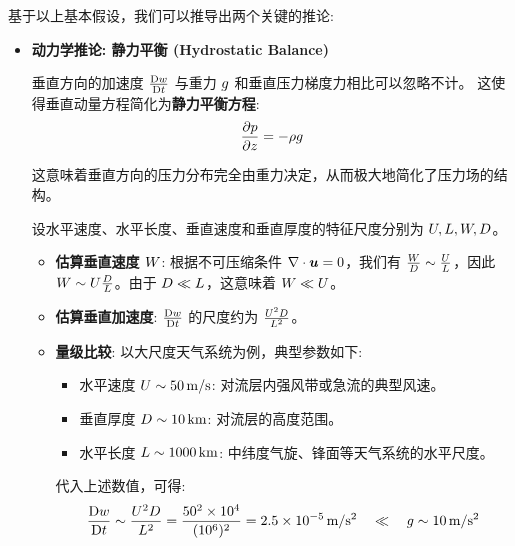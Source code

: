 基于以上基本假设，我们可以推导出两个关键的推论:
\begin{itemize}
    \item \textbf{动力学推论: 静力平衡 (Hydrostatic Balance)}

    垂直方向的加速度 $\frac{\mathrm{D} w}{\mathrm{D} t}$ 与重力 $g$ 和垂直压力梯度力相比可以忽略不计。
    这使得垂直动量方程简化为\textbf{静力平衡方程}:
    \begin{equation}
        \pde{\pressure}{z} = -\density \gravityconst
        \label{eq:hydrostatic}
    \end{equation}

    这意味着垂直方向的压力分布完全由重力决定，从而极大地简化了压力场的结构。

    \begin{proofbox}[尺度分析]
        设水平速度、水平长度、垂直速度和垂直厚度的特征尺度分别为 $U, L, W, D$。
        \begin{itemize}
            \item \textbf{估算垂直速度 $W$}: 根据不可压缩条件 $\nabla \cdot \bm{u} = 0$，我们有 $\frac{W}{D} \sim \frac{U}{L}$，因此 $W \sim U \frac{D}{L}$。由于 $D \ll L$，这意味着 $W \ll U$。

            \item \textbf{估算垂直加速度}: $\frac{\mathrm{D} w}{\mathrm{D} t}$ 的尺度约为 $\frac{U^2 D}{L^2}$。

            \item \textbf{量级比较}: 以大尺度天气系统为例，典型参数如下:
            \begin{itemize}
                \item 水平速度 $U \sim 50\,\mathrm{m/s}$: 对流层内强风带或急流的典型风速。
                \item 垂直厚度 $D \sim 10\,\mathrm{km}$: 对流层的高度范围。
                \item 水平长度 $L \sim 1000\,\mathrm{km}$: 中纬度气旋、锋面等天气系统的水平尺度。
            \end{itemize}

            代入上述数值，可得:
            \begin{equation*}
                \frac{\mathrm{D} w}{\mathrm{D} t} \sim \frac{U^2 D}{L^2} = \frac{50^2 \times 10^4}{(10^6)^2} = 2.5 \times 10^{-5}\,\mathrm{m/s^2} \quad \ll \quad g \sim 10\,\mathrm{m/s^2}
            \end{equation*}


\end{itemize}
\end{proofbox}
\end{itemize}
